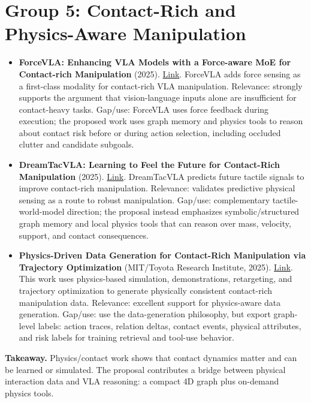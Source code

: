 \section*{Group 5: Contact-Rich and Physics-Aware Manipulation}

\begin{itemize}
\item \textbf{ForceVLA: Enhancing VLA Models with a Force-aware MoE for Contact-rich Manipulation} (2025). \href{https://arxiv.org/abs/2505.22159}{Link}. ForceVLA adds force sensing as a first-class modality for contact-rich VLA manipulation. Relevance: strongly supports the argument that vision-language inputs alone are insufficient for contact-heavy tasks. Gap/use: ForceVLA uses force feedback during execution; the proposed work uses graph memory and physics tools to reason about contact risk before or during action selection, including occluded clutter and candidate subgoals.

\item \textbf{DreamTacVLA: Learning to Feel the Future for Contact-Rich Manipulation} (2025). \href{https://arxiv.org/abs/2512.23864}{Link}. DreamTacVLA predicts future tactile signals to improve contact-rich manipulation. Relevance: validates predictive physical sensing as a route to robust manipulation. Gap/use: complementary tactile-world-model direction; the proposal instead emphasizes symbolic/structured graph memory and local physics tools that can reason over mass, velocity, support, and contact consequences.

\item \textbf{Physics-Driven Data Generation for Contact-Rich Manipulation via Trajectory Optimization} (MIT/Toyota Research Institute, 2025). \href{https://arxiv.org/abs/2502.20382}{Link}. This work uses physics-based simulation, demonstrations, retargeting, and trajectory optimization to generate physically consistent contact-rich manipulation data. Relevance: excellent support for physics-aware data generation. Gap/use: use the data-generation philosophy, but export graph-level labels: action traces, relation deltas, contact events, physical attributes, and risk labels for training retrieval and tool-use behavior.
\end{itemize}

\textbf{Takeaway.} Physics/contact work shows that contact dynamics matter and can be learned or simulated. The proposal contributes a bridge between physical interaction data and VLA reasoning: a compact 4D graph plus on-demand physics tools.

